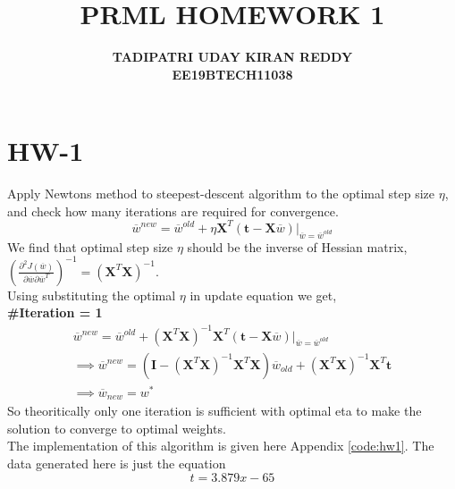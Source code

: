 \documentclass{article}
\begin{document}
\title{{\textbf{PRML HOMEWORK 1}}}
\author{\textbf{TADIPATRI UDAY KIRAN REDDY}\\\textbf{EE19BTECH11038}}
\maketitle

\section*{\hfil HW-1}
Apply Newtons method to steepest-descent algorithm to the optimal step size $\eta$, and check how many iterations are required for convergence.
\begin{equation*}
\overline{w}^{new} = \overline{w}^{old} + \eta{\mathbf{X}^T(\mathbf{t}-\mathbf{X}\overline{w})}|_{\overline{w} = \overline{w}^{old}}
\end{equation*}
\newline
\newline
We find that optimal step size $\eta$ should be the inverse of Hessian matrix, $\left(\frac{{\partial}^2 J(\overline{w})}{\partial \overline{w} \partial \overline{w}^T}\right)^{-1} = \left(\textbf{X}^T\textbf{X}\right)^{-1}$.\\
Using substituting the optimal $\eta$ in update equation we get,\\
\textbf{\#Iteration = 1}
\begin{gather*}
\overline{w}^{new} = \overline{w}^{old} + \left(\textbf{X}^T\textbf{X}\right)^{-1}{\mathbf{X}^T(\mathbf{t}-\mathbf{X}\overline{w})}|_{\overline{w} = \overline{w}^{old}}\\
\implies \overline{w}^{new} = \left(\textbf{I} - \left(\textbf{X}^T\textbf{X}\right)^{-1}\textbf{X}^T\textbf{X}\right){\overline{w}_{old}} + \left(\textbf{X}^T\textbf{X}\right)^{-1}{\mathbf{X}^T\mathbf{t}}\\
\implies \overline{w}_{new} = w^{*}
\end{gather*}
So theoritically only one iteration is sufficient with optimal eta to make the solution to converge to optimal weights.\\
The implementation of this algorithm is given here Appendix \ref{code:hw1}. The data generated here is just the equation
\begin{equation*}
	t = 3.879x - 65
\end{equation*}
\end{document}
